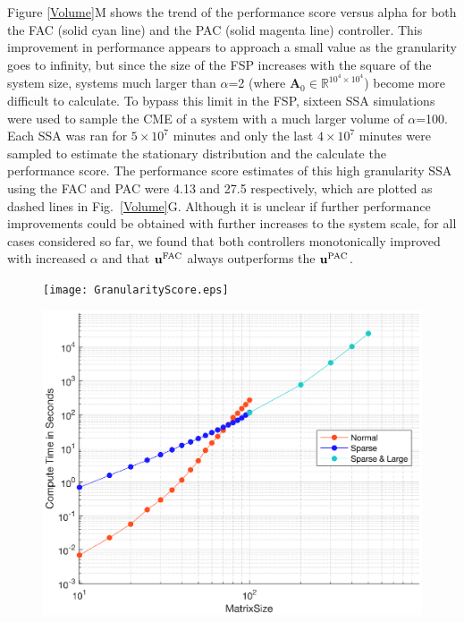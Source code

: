 \documentclass[12pt]{article}
\begin{document}
Figure \ref{Volume}M shows the trend of the performance score versus alpha for both the FAC (solid cyan line) and the PAC (solid magenta line) controller. This improvement in performance appears to approach a small value as the granularity goes to infinity, but since the size of the FSP increases with the square of the system size, systems much larger than $\alpha$=2 (where $\mathbf{A}_0\in \mathbb{R}^{10^4\times10^4}$) become more difficult to calculate. 
To bypass this limit in the FSP, sixteen SSA simulations were used to sample the CME of a system with a much larger volume of $\alpha$=100. Each SSA was ran for $5\times10^7$ minutes and only the last $4\times10^7$ minutes were sampled to estimate the stationary distribution and the calculate the performance score. The performance score estimates of this high granularity SSA using the FAC and PAC were 4.13 and 27.5 respectively, which are plotted as dashed lines in Fig.\ \ref{Volume}G. Although it is unclear if further performance improvements could be obtained with further increases to the system scale, for all cases considered so far, we found that both controllers monotonically improved with increased $\alpha$ and that $\mathbf{u}^{\rm FAC}$ always outperforms the $\mathbf{u}^{\rm PAC}$. 

\begin{figure}
\begin{center}
\texttt{[image: GranularityScore.eps]}
\caption{}
\label{}
\end{center}
\end{figure}

\begin{figure}
\begin{center}
\includegraphics[width=1\textwidth]{CalculationSpeed.eps}
\caption{}
\label{Speed}
\end{center}
\end{figure}
\end{document}
